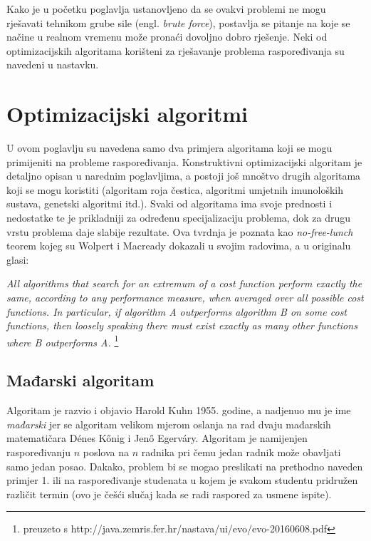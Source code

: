 \documentclass[times, utf8, zavrsni]{fer}
\begin{document}
Kako je u početku poglavlja ustanovljeno da se ovakvi problemi ne mogu rješavati tehnikom grube sile (engl. \textit{brute force}), postavlja
se pitanje na koje se načine u realnom vremenu može pronaći dovoljno dobro rješenje. Neki od optimizacijskih algoritama korišteni
za rješavanje problema raspoređivanja su navedeni u nastavku.

\section{Optimizacijski algoritmi}
U ovom poglavlju su navedena samo dva primjera algoritama koji se mogu primijeniti na probleme raspoređivanja. Konstruktivni optimizacijski
algoritam je detaljno opisan u narednim poglavljima, a postoji još mnoštvo drugih algoritama koji se mogu koristiti (algoritam roja
čestica, algoritmi umjetnih imunoloških sustava, genetski algoritmi itd.). Svaki od algoritama ima svoje prednosti i nedostatke te je
prikladniji za određenu specijalizaciju problema, dok za drugu vrstu problema daje slabije rezultate. Ova tvrdnja je poznata kao
\emph{no-free-lunch} teorem kojeg su Wolpert i Macready dokazali u svojim radovima, a u originalu glasi:

\begin{framed}
\emph{All algorithms that search for an extremum of a cost function perform exactly the same, according to any performance measure,
when averaged over all possible cost functions. In particular, if algorithm A outperforms algorithm B on some cost functions, then
loosely speaking there must exist exactly as many other functions where B outperforms A.}
\footnote{preuzeto s http://java.zemris.fer.hr/nastava/ui/evo/evo-20160608.pdf}
\end{framed}



\subsection{Mađarski algoritam}
Algoritam je razvio i objavio Harold Kuhn 1955. godine, a nadjenuo mu je ime \textit{mađarski} jer se algoritam velikom mjerom oslanja
na rad dvaju mađarskih matematičara Dénes Kőnig i Jenő Egerváry.
Algoritam je namijenjen raspoređivanju $n$ poslova na $n$ radnika pri čemu jedan radnik može obavljati samo jedan posao. Dakako,
problem bi se mogao preslikati na prethodno naveden primjer 1. ili na raspoređivanje studenata u kojem je svakom studentu pridružen
različit termin (ovo je češći slučaj kada se radi raspored za usmene ispite).
\end{document}

